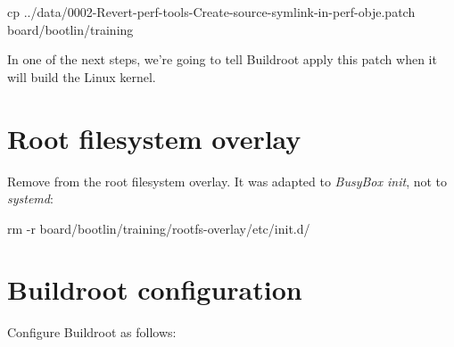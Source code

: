 \begin{bashinput}
cp ../data/0002-Revert-perf-tools-Create-source-symlink-in-perf-obje.patch board/bootlin/training
\end{bashinput}

In one of the next steps, we're going to tell Buildroot apply this
patch when it will build the Linux kernel.
\fi

\section{Root filesystem overlay}

Remove  from the root filesystem overlay.
It was adapted to {\em BusyBox init}, not to {\em systemd}:

\begin{bashinput}
rm -r board/bootlin/training/rootfs-overlay/etc/init.d/
\end{bashinput}

\section{Buildroot configuration}

Configure Buildroot as follows:

